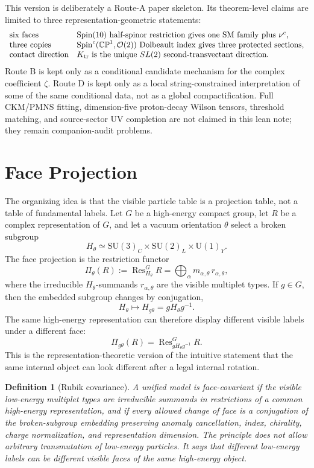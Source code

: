 \documentclass[
  aps,
  prd,
  preprint,
  nofootinbib,
  superscriptaddress,
  longbibliography
]{revtex4-2}
\newcommand{\Spin}{\mathrm{Spin}}
\newcommand{\SU}{\mathrm{SU}}
\newcommand{\U}{\mathrm{U}}
\newcommand{\CP}{\mathbb{CP}}
\newcommand{\cO}{\mathcal{O}}
\DeclareMathOperator{\Res}{Res}
\newtheorem{definition}[theorem]{Definition}
\begin{document}
This version is deliberately a Route-A paper skeleton.  Its theorem-level
claims are limited to three representation-geometric statements:
\[
\begin{array}{ll}
\text{six faces} & \Spin(10)\text{ half-spinor restriction gives one SM
family plus }\nu^c,\\
\text{three copies} & \Spin^c(\CP^1,\cO(2))\text{ Dolbeault index gives
three protected sections},\\
\text{contact direction} & K_{\rm tr}\text{ is the unique }SL(2)\text{
second-transvectant direction}.
\end{array}
\]
Route B is kept only as a conditional candidate mechanism for the complex
coefficient \(\zeta\).  Route D is kept only as a local string-constrained
interpretation of some of the same conditional data, not as a global
compactification.  Full CKM/PMNS fitting, dimension-five proton-decay Wilson
tensors, threshold matching, and source-sector UV completion are not claimed
in this lean note; they remain companion-audit problems.

\section{Face Projection}

The organizing idea is that the visible particle table is a projection table,
not a table of fundamental labels.  Let \(G\) be a high-energy compact group,
let \(R\) be a complex representation of \(G\), and let a vacuum orientation
\(\theta\) select a broken subgroup
\[
  H_\theta\simeq \SU(3)_C\times\SU(2)_L\times\U(1)_Y .
\]
The face projection is the restriction functor
\[
  \Pi_\theta(R):=\Res^{G}_{H_\theta}R
  =\bigoplus_\alpha m_{\alpha,\theta}\,r_{\alpha,\theta},
\]
where the irreducible \(H_\theta\)-summands \(r_{\alpha,\theta}\) are the
visible multiplet types.  If \(g\in G\), then the embedded subgroup changes by
conjugation,
\[
  H_\theta\longmapsto H_{g\theta}=gH_\theta g^{-1}.
\]
The same high-energy representation can therefore display different visible
labels under a different face:
\[
  \Pi_{g\theta}(R)
  =
  \Res^{G}_{gH_\theta g^{-1}}R .
\]
This is the representation-theoretic version of the intuitive statement that
the same internal object can look different after a legal internal rotation.

\begin{definition}[Rubik covariance]
A unified model is face-covariant if the visible low-energy multiplet types are
irreducible summands in restrictions of a common high-energy representation,
and if every allowed change of face is a conjugation of the broken-subgroup
embedding preserving anomaly cancellation, index, chirality, charge
normalization, and representation dimension.  The principle does not allow
arbitrary transmutation of low-energy particles.  It says that different
low-energy labels can be different visible faces of the same high-energy
object.
\end{definition}
\end{document}
